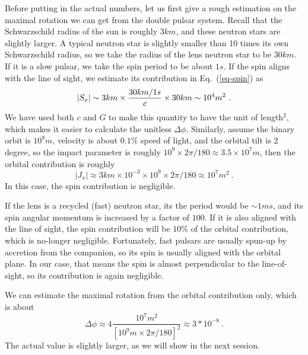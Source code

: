 \documentclass[aps,showpacs,twocolumn,floats,prd,superscriptaddress,nofootinbib]{revtex4}
\begin{document}
Before putting in the actual numbers, let us first give a rough estimation on the maximal rotation we can get from the double pulsar system.
Recall that the Schwarzschild radius of the sun is roughly $3km$, and these neutron stars are slightly larger.
A typical neutron star is slightly smaller than 10 times its own Schwarzschild radius, so we take the radius of the lens neutron star to be $30km$.
If it is a slow pulsar, we take the spin period to be about $1s$.
If the spin aligns with the line of sight, we estimate its contribution in Eq.~(\ref{eq-spin}) as
\begin{equation}
|S_x|  \sim  3km \times \frac{30km/1s}{c} \times 30km \sim 10^4 m^2~. \nonumber \\
{\color{red}   
}
\end{equation}
We have used both $c$ and $G$ to make this quantity to have the unit of length$^2$, which makes it easier to calculate the unitless $\Delta\phi$.
Similarly, assume the binary orbit is $10^9 m$, velocity is about $0.1\%$ speed of light, and the orbital tilt is $2$ degree, so the impact parameter is roughly $10^9 \times 2\pi/180 \approx 3.5 \times 10^7 m$, then the orbital contribution is roughly
\begin{equation}
|J_x| \approx  3km \times 10^{-3} \times 10^9 \times 2\pi/180  \approx 10^7 m^2~.
\end{equation}
In this case, the spin contribution is negligible.

If the lens is a recycled (fast) neutron star, its the period would be $\sim 1ms$, and its spin angular momentum is increased by a factor of $100$.
If it is also aligned with the line of sight, the spin contribution will be $10\%$ of the orbital contribution, which is no-longer negligible.
Fortunately, fast pulsars are usually spun-up by accretion from the companion, so its spin is usually aligned with the orbital plane.
In our case, that means the spin is almost perpendicular to the line-of-sight, so its contribution is again negligible.

We can estimate the maximal rotation from the orbital contribution only, which is about\begin{equation}
\Delta\phi \approx 4 \frac{10^7 m^2}{\left[  10^9m\times  2\pi / 180 \right]^2}\approx 3*10^{-8}~.
\end{equation}
The actual value is slightly larger, as we will show in the next session.

\end{document}
